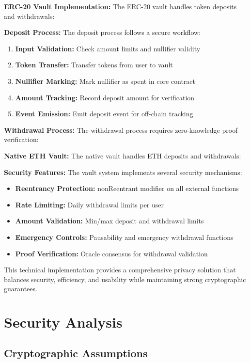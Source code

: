 \documentclass[11pt,a4paper]{article}
\begin{document}
\textbf{ERC-20 Vault Implementation:}
The ERC-20 vault handles token deposits and withdrawals:


\textbf{Deposit Process:}
The deposit process follows a secure workflow:

\begin{enumerate}
    \item \textbf{Input Validation:} Check amount limits and nullifier validity
    \item \textbf{Token Transfer:} Transfer tokens from user to vault
    \item \textbf{Nullifier Marking:} Mark nullifier as spent in core contract
    \item \textbf{Amount Tracking:} Record deposit amount for verification
    \item \textbf{Event Emission:} Emit deposit event for off-chain tracking
\end{enumerate}

\textbf{Withdrawal Process:}
The withdrawal process requires zero-knowledge proof verification:


\textbf{Native ETH Vault:}
The native vault handles ETH deposits and withdrawals:


\textbf{Security Features:}
The vault system implements several security mechanisms:

\begin{itemize}
    \item \textbf{Reentrancy Protection:} nonReentrant modifier on all external functions
    \item \textbf{Rate Limiting:} Daily withdrawal limits per user
    \item \textbf{Amount Validation:} Min/max deposit and withdrawal limits
    \item \textbf{Emergency Controls:} Pausability and emergency withdrawal functions
    \item \textbf{Proof Verification:} Oracle consensus for withdrawal validation
\end{itemize}

This technical implementation provides a comprehensive privacy solution that balances security, efficiency, and usability while maintaining strong cryptographic guarantees.

\section{Security Analysis}

\subsection{Cryptographic Assumptions}
\end{document}
